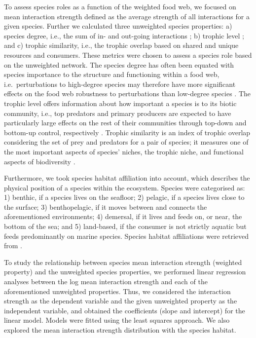 \documentclass[gc, manuscript]{copernicus}
\begin{document}
To assess species roles as a function of the weighted food web, we
focused on mean interaction strength defined as the average strength of
all interactions for a given species. Further we calculated three
unweighted species properties: a) species degree, i.e., the sum of in-
and out-going interactions ; b) trophic level ; and c) trophic
similarity, i.e., the trophic overlap based on shared and unique
resources and consumers. These metrics were chosen to assess a species
role based on the unweighted network. The species degree has often been
equated with species importance to the structure and functioning within
a food web, i.e.~perturbations to high-degree species may therefore have
more significant effects on the food web robustness to perturbations
than low-degree species
\citetext{\citealp{Dunne2002a}; \citealp[references
in][]{Cirtwill2018a}}. The trophic level offers information about how
important a species is to its biotic community, i.e., top predators and
primary producers are expected to have particularly large effects on the
rest of their communities through top-down and bottom-up control,
respectively \citep[references in][]{Cirtwill2018a}. Trophic similarity
is an index of trophic overlap considering the set of prey and predators
for a pair of species; it measures one of the most important aspects of
species' niches, the trophic niche, and functional aspects of
biodiversity \citep{Martinez1991, Williams2000}.

Furthermore, we took species habitat affiliation into account, which
describes the physical position of a species within the ecosystem.
Species were categorised as: 1) benthic, if a species lives on the
seafloor; 2) pelagic, if a species lives close to the surface; 3)
benthopelagic, if it moves between and connects the aforementioned
environments; 4) demersal, if it lives and feeds on, or near, the bottom
of the sea; and 5) land-based, if the consumer is not strictly aquatic
but feeds predominantly on marine species. Species habitat affiliations
were retrieved from \citet{Jacob2011}.

To study the relationship between species mean interaction strength
(weighted property) and the unweighted species properties, we performed
linear regression analyses between the log mean interaction strength and
each of the aforementioned unweighted properties. Thus, we considered
the interaction strength as the dependent variable and the given
unweighted property as the independent variable, and obtained the
coefficients (slope and intercept) for the linear model. Models were
fitted using the least squares approach. We also explored the mean
interaction strength distribution with the species habitat.
\end{document}
